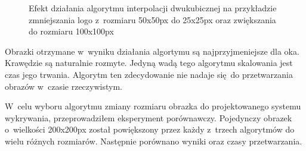 \begin{figure}[h]
    \centering
    \qquad
    \qquad
    \caption{Efekt działania algorytmu interpolacji dwukubicznej na przykładzie zmniejszania logo \bk z~rozmiaru 50x50px do 25x25px oraz zwiększania do rozmiaru 100x100px}
    \label{fig:bicubic-result}
\end{figure}

Obrazki otrzymane w~wyniku działania algortymu są najprzyjmeniejsze dla oka. Krawędzie są naturalnie rozmyte. Jedyną wadą tego algorytmu skalowania jest czas jego trwania. Algorytm ten zdecydowanie nie nadaje się do przetwarzania obrazów w~czasie rzeczywistym.

W~celu wyboru algorytmu zmiany rozmiaru obrazka do projektowanego systemu wykrywania, przeprowadziłem eksperyment porównawczy. Pojedynczy obrazek o~wielkości 200x200px został powiększony przez każdy z~trzech algorytmów do wielu różnych rozmiarów. Następnie porównano wyniki oraz czasy przetwarzania. 

